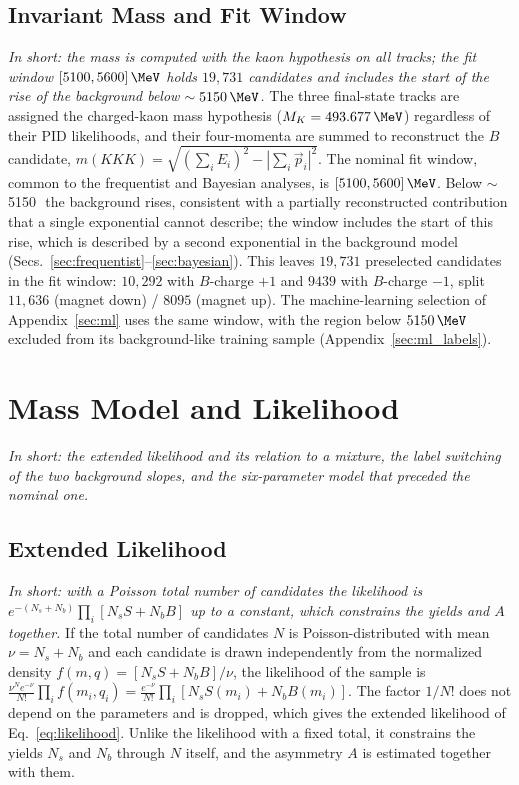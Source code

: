 \subsection{Invariant Mass and Fit Window}
\emph{In short: the mass is computed with the kaon hypothesis on all tracks; the fit window $[5100,5600]\,\MeV$ holds $19{,}731$ candidates and includes the start of the rise of the background below $\sim5150\,\MeV$.}
The three final-state tracks are assigned the charged-kaon mass hypothesis ($M_K=493.677\,\MeV$) regardless of their PID likelihoods, and their four-momenta are summed to reconstruct the $B$ candidate, $m(KKK)=\sqrt{(\sum_i E_i)^2-|\sum_i \vec{p}_i|^2}$. The nominal fit window, common to the frequentist and Bayesian analyses, is $[5100,5600]\,\MeV$. Below $\sim$5150\,\MeV\ the background rises, consistent with a partially reconstructed contribution that a single exponential cannot describe; the window includes the start of this rise, which is described by a second exponential in the background model (Secs.~\ref{sec:frequentist}--\ref{sec:bayesian}). This leaves $19{,}731$ preselected candidates in the fit window: $10{,}292$ with $B$-charge $+1$ and $9439$ with $B$-charge $-1$, split $11{,}636$ (magnet down) / $8095$ (magnet up). The machine-learning selection of Appendix~\ref{sec:ml} uses the same window, with the region below $5150\,\MeV$ excluded from its background-like training sample (Appendix~\ref{sec:ml_labels}).

\FloatBarrier

\section{Mass Model and Likelihood}
\label{app:model}
\emph{In short: the extended likelihood and its relation to a mixture, the label switching of the two background slopes, and the six-parameter model that preceded the nominal one.}

\subsection{Extended Likelihood}
\emph{In short: with a Poisson total number of candidates the likelihood is $e^{-(N_s+N_b)}\prod_i[N_s S+N_b B]$ up to a constant, which constrains the yields and $A$ together.}
If the total number of candidates $N$ is Poisson-distributed with mean $\nu=N_s+N_b$ and each candidate is drawn independently from the normalized density $f(m,q)=[N_s S+N_b B]/\nu$, the likelihood of the sample is $\frac{\nu^N e^{-\nu}}{N!}\prod_{i}f(m_i,q_i)=\frac{e^{-\nu}}{N!}\prod_i[N_s S(m_i)+N_b B(m_i)]$. The factor $1/N!$ does not depend on the parameters and is dropped, which gives the extended likelihood of Eq.~\eqref{eq:likelihood}. Unlike the likelihood with a fixed total, it constrains the yields $N_s$ and $N_b$ through $N$ itself, and the asymmetry $A$ is estimated together with them.

